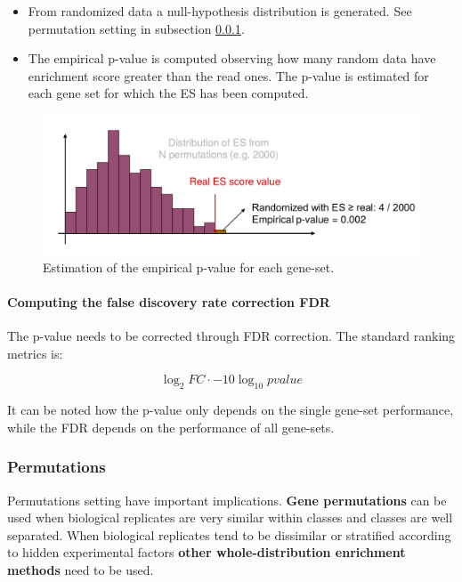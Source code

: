 			\begin{multicols}{2}
				\begin{itemize}
					\item From randomized data a null-hypothesis distribution is generated.
						See permutation setting in subsection \ref{subsub:perm}.
					\item The empirical p-value is computed observing how many random data have enrichment score greater than the read ones.
						The p-value is estimated for each gene set for which the ES has been computed.
				\end{itemize}
			\end{multicols}

			\begin{figure}[H]
				\centering
				\includegraphics[scale=0.2]{method2}
				\caption{Estimation of the empirical p-value for each gene-set.}
				\label{fig:method1}
			\end{figure}

			\paragraph{Computing the false discovery rate correction FDR}
			The p-value needs to be corrected through FDR correction.
			The standard ranking metrics is:

			$$\log_2 FC\cdot -10\log_{10} pvalue$$

			It can be noted how the p-value only depends on the single gene-set performance, while the FDR depends on the performance of all gene-sets.

		\subsubsection{Permutations}\label{subsub:perm}
		Permutations setting have important implications.
		\textbf{Gene permutations} can be used when biological replicates are very similar within classes and classes are well separated.
		When biological replicates tend to be dissimilar or stratified according to hidden experimental factors \textbf{other whole-distribution enrichment methods} need to be used.

